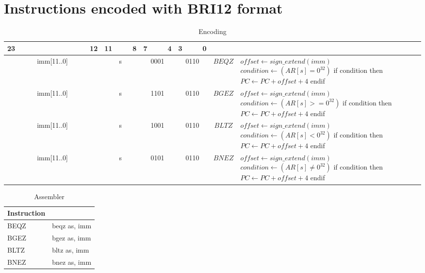 \section{Instructions encoded with BRI12 format}
	\begin{longtable}{llllllllllllllllllllllll  p{1cm}  p{7cm} | }
		\caption{Encoding\label{long}}\\
		23 & & & & & & & & & & & 12 & 11 & & & 8 & 7 & & & 4 & 3 & & & 0 & &
		\multicolumn{1}{c}{}\\
		\hline
		\multicolumn{12}{|c|}{imm[11..0]} & \multicolumn{4}{c|}{s} & \multicolumn{4}{c|}{0001} & \multicolumn{4}{c|}{0110} & \multicolumn{1}{c|}{$BEQZ$} & $offset \leftarrow sign\_extend(imm)$ \newline $condition \leftarrow (AR[s] = 0^{32})$ \newline if condition then \newline $PC \leftarrow PC + offset + 4$ \newline endif\\ \hline
		\multicolumn{12}{|c|}{imm[11..0]} & \multicolumn{4}{c|}{s} & \multicolumn{4}{c|}{1101} & \multicolumn{4}{c|}{0110} & \multicolumn{1}{c|}{$BGEZ$} & $offset \leftarrow sign\_extend(imm)$ \newline $condition \leftarrow (AR[s] >= 0^{32})$ \newline if condition then \newline $PC \leftarrow PC + offset + 4$ \newline endif\\ \hline
		\multicolumn{12}{|c|}{imm[11..0]} & \multicolumn{4}{c|}{s} & \multicolumn{4}{c|}{1001} & \multicolumn{4}{c|}{0110} & \multicolumn{1}{c|}{$BLTZ$} & $offset \leftarrow sign\_extend(imm)$ \newline $condition \leftarrow (AR[s] < 0^{32})$ \newline if condition then \newline $PC \leftarrow PC + offset + 4$ \newline endif\\ \hline
		\multicolumn{12}{|c|}{imm[11..0]} & \multicolumn{4}{c|}{s} & \multicolumn{4}{c|}{0101} & \multicolumn{4}{c|}{0110} & \multicolumn{1}{c|}{$BNEZ$} & $offset \leftarrow sign\_extend(imm)$ \newline $condition \leftarrow (AR[s] \neq 0^{32})$ \newline if condition then \newline $PC \leftarrow PC + offset + 4$ \newline endif\\ \hline
	\end{longtable}

	\begin{longtable}{|p{5cm}|p{5cm}|}
		\caption{Assembler\label{long}}\\		
		\hline
		Instruction & \\
		\hline
		BEQZ & beqz as, imm\\ \hline
		BGEZ & bgez as, imm\\ \hline
		BLTZ & bltz as, imm\\ \hline
		BNEZ & bnez as, imm\\ \hline
	\end{longtable}
